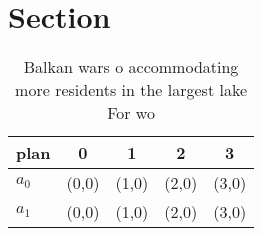 \documentclass[a4paper]{article}
\begin{document}
\section{Section}

\begin{table}
\begin{adjustbox}{width=0.5\columnwidth}
\begin{tabular}{|l|l|l|l|l|}
\hline
\textbf{plan} & \multicolumn{1}{c|}{\textbf{0}} & \multicolumn{1}{c|}{\textbf{1}} & \multicolumn{1}{c|}{\textbf{2}} & \multicolumn{1}{c|}{\textbf{3}} \\ \hline
\textbf{$a_0$}  & (0,0) & (1,0) & (2,0) & (3,0) \\ \hline
\textbf{$a_1$}  & (0,0) & (1,0) & (2,0) & (3,0) \\ \hline
\end{tabular}
\end{adjustbox}
\caption{Balkan wars o accommodating more residents in the largest lake For wo
}
\end{table}
\end{document}

